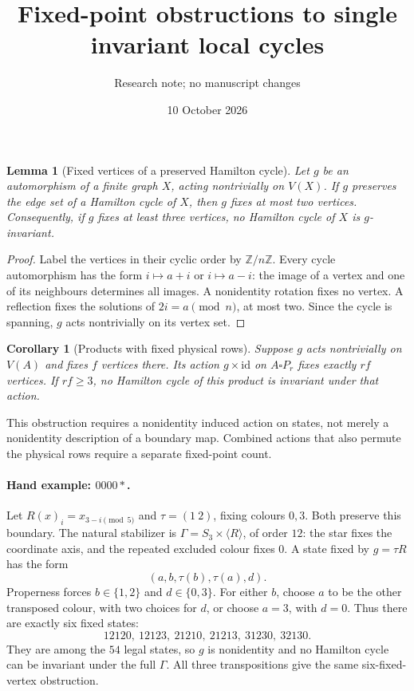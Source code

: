 \documentclass[11pt]{article}
\title{Fixed-point obstructions to single invariant local cycles}
\author{Research note; no manuscript changes}
\date{10 October 2026}
\newtheorem{lemma}{Lemma}
\newtheorem{corollary}{Corollary}
\begin{document}
\maketitle

\begin{lemma}[Fixed vertices of a preserved Hamilton cycle]
Let $g$ be an automorphism of a finite graph $X$, acting nontrivially
on $V(X)$. If $g$ preserves the edge set of a Hamilton cycle of $X$,
then $g$ fixes at most two vertices. Consequently, if $g$ fixes at
least three vertices, no Hamilton cycle of $X$ is $g$-invariant.
\end{lemma}
\begin{proof}
Label the vertices in their cyclic order by $\mathbb Z/n\mathbb Z$.
Every cycle automorphism has the form $i\mapsto a+i$ or $i\mapsto a-i$:
the image of a vertex and one of its neighbours determines all images.
A nonidentity rotation fixes no vertex. A reflection fixes the solutions
of $2i=a\pmod n$, at most two. Since the cycle is spanning, $g$ acts
nontrivially on its vertex set.
\end{proof}

\begin{corollary}[Products with fixed physical rows]
Suppose $g$ acts nontrivially on $V(A)$ and fixes $f$ vertices there.
Its action $g\times\mathrm{id}$ on $A\square P_r$ fixes exactly $rf$
vertices. If $rf\ge3$, no Hamilton cycle of this product is invariant
under that action.
\end{corollary}
This obstruction requires a nonidentity induced action on states, not
merely a nonidentity description of a boundary map. Combined actions
that also permute the physical rows require a separate fixed-point count.

\paragraph{Hand example: $0000\ast$.}
Let $R(x)_i=x_{3-i\pmod5}$ and $\tau=(1\ 2)$, fixing colours $0,3$.
Both preserve this boundary. The natural stabilizer is
$\Gamma=S_3\times\langle R\rangle$, of order $12$: the star fixes
the coordinate axis, and the repeated excluded colour fixes $0$.
A state fixed by $g=\tau R$ has the form
\[
       (a,b,\tau(b),\tau(a),d).
\]
Properness forces $b\in\{1,2\}$ and $d\in\{0,3\}$.
For either $b$, choose $a$ to be the other transposed colour, with
two choices for $d$, or choose $a=3$, with $d=0$.
Thus there are exactly six fixed states:
\[
 12120,\ 12123,\ 21210,\ 21213,\ 31230,\ 32130.
\]
They are among the $54$ legal states, so $g$ is nonidentity and no
Hamilton cycle can be invariant under the full $\Gamma$.
All three transpositions give the same six-fixed-vertex obstruction.
\end{document}
